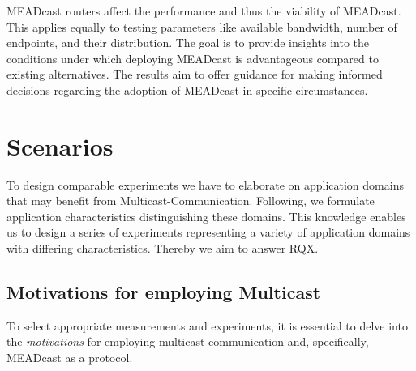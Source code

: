 \begin{enumerate}
            MEADcast routers affect the performance and thus the viability of
            MEADcast.
        This applies equally to testing parameters like available bandwidth,
            number of endpoints, and their distribution.
        The goal is to provide insights into the conditions under which
            deploying MEADcast is advantageous compared to existing
            alternatives.
        The results aim to offer guidance for making informed decisions
            regarding the adoption of MEADcast in specific circumstances.
\end{enumerate}




\section{Scenarios} %
\label{sec:Scenarios}


To design comparable experiments we have to elaborate on application domains
    that may benefit from Multicast-Communication.
Following, we formulate application characteristics distinguishing these
    domains.
This knowledge enables us to design a series of experiments representing
    a variety of application domains with differing characteristics.
Thereby we aim to answer RQX.

\subsection{Motivations for employing Multicast} %
\label{sub:MotivationsForMulticast}
To select appropriate measurements and experiments, it is essential to delve
    into the \textit{motivations} for employing multicast communication and,
    specifically, MEADcast as a protocol.

